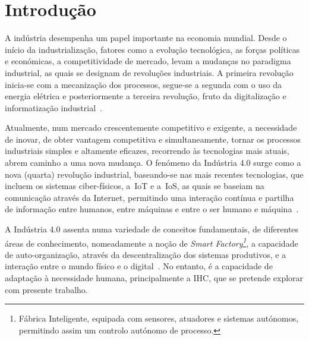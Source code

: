 \chapter{Introdução}
\label{chap:chapter1}

A indústria desempenha um papel importante na economia mundial. Desde o início da industrialização, fatores como a evolução tecnológica, as forças políticas e económicas, a competitividade de mercado, levam a mudanças no paradigma industrial, as quais se designam de revoluções industriais. A primeira revolução inicia-se com a mecanização dos processos, segue-se a segunda com o uso da energia elétrica e posteriormente a terceira revolução, fruto da digitalização e informatização industrial~\parencite{industry40, modern_industrial_revolution_exit_failure_internal_control_systems}.

Atualmente, num mercado crescentemente competitivo e exigente, a necessidade de inovar, de obter vantagem competitiva e simultaneamente, tornar os processos industriais simples e altamente eficazes, recorrendo às tecnologias mais atuais, abrem caminho a uma nova mudança. O fenómeno da Indústria 4.0 surge como a nova (quarta) revolução industrial, baseando-se nas mais recentes tecnologias, que incluem os sistemas ciber-físicos, a~\gls{IoT} e a~\gls{IoS}, as quais se baseiam na comunicação através da Internet, permitindo uma interação contínua e partilha de informação entre humanos, entre máquinas e entre o ser humano e máquina~\parencite{complex_view_industry40}. 

A Indústria 4.0 assenta numa variedade de conceitos fundamentais, de diferentes áreas de conhecimento, nomeadamente a noção de \textit{Smart Factory\footnote{Fábrica Inteligente, equipada com sensores, atuadores e sistemas autónomos, permitindo assim um controlo autónomo de processo.}}, a capacidade de auto-organização, através da descentralização dos sistemas produtivos, e a interação entre o mundo físico e o digital~\parencite[Fundamental Concepts, p.240]{industry40}. No entanto, é a capacidade de adaptação à necessidade humana, principalmente a \gls{IHC}, que se pretende explorar com presente trabalho.

